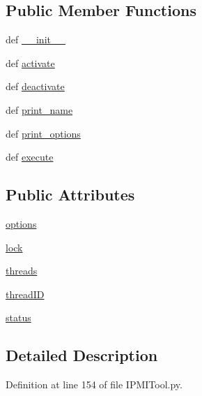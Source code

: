 \subsection*{Public Member Functions}
\begin{DoxyCompactItemize}
\item 
def \hyperlink{classIPMITool_1_1IPMITool_a5de40b2861cf82d75b68d65a00f56fd7}{\-\_\-\-\_\-init\-\_\-\-\_\-}
\item 
def \hyperlink{classIPMITool_1_1IPMITool_a7033e64733a6165c392c71159c75405c}{activate}
\item 
def \hyperlink{classIPMITool_1_1IPMITool_a7639dc29d494f89f9cd00c164984a014}{deactivate}
\item 
def \hyperlink{classIPMITool_1_1IPMITool_ad99bf0f2639b3f838e1c94efd64e24ad}{print\-\_\-name}
\item 
def \hyperlink{classIPMITool_1_1IPMITool_a40df31a86acffb30ca43ab938bd936ab}{print\-\_\-options}
\item 
def \hyperlink{classIPMITool_1_1IPMITool_a308c802b6dcf01604da2538f72cb2126}{execute}
\end{DoxyCompactItemize}
\subsection*{Public Attributes}
\begin{DoxyCompactItemize}
\item 
\hyperlink{classIPMITool_1_1IPMITool_a9f0f9484b1b8f6a0df8338f7894c8823}{options}
\item 
\hyperlink{classIPMITool_1_1IPMITool_a36a9429fca7200e0a6d1d78002b95d11}{lock}
\item 
\hyperlink{classIPMITool_1_1IPMITool_a2f6ca8b0b509ba2c514b72312841b2d6}{threads}
\item 
\hyperlink{classIPMITool_1_1IPMITool_aaa15d2dc90d9e3a45adc4519912c811d}{thread\-I\-D}
\item 
\hyperlink{classIPMITool_1_1IPMITool_a4dba85133ceca9edff481c575cb468d9}{status}
\end{DoxyCompactItemize}


\subsection{Detailed Description}


Definition at line 154 of file I\-P\-M\-I\-Tool.\-py.



